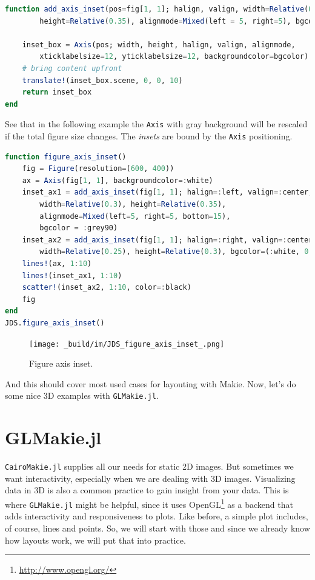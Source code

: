 \documentclass[
  notoc %
]{tufte-book}
\DeclareRobustCommand{\href}[2]{#2\footnote{\url{#1}}}
\newcommand{\passthrough}[1]{#1}
\begin{document}
\begin{lstlisting}[language=Julia]
function add_axis_inset(pos=fig[1, 1]; halign, valign, width=Relative(0.5),
        height=Relative(0.35), alignmode=Mixed(left = 5, right=5), bgcolor=:lightgray)

    inset_box = Axis(pos; width, height, halign, valign, alignmode,
        xticklabelsize=12, yticklabelsize=12, backgroundcolor=bgcolor)
    # bring content upfront
    translate!(inset_box.scene, 0, 0, 10)
    return inset_box
end
\end{lstlisting}

See that in the following example the \passthrough{\lstinline!Axis!}
with gray background will be rescaled if the total figure size changes.
The \emph{insets} are bound by the \passthrough{\lstinline!Axis!}
positioning.

\begin{lstlisting}[language=Julia]
function figure_axis_inset()
    fig = Figure(resolution=(600, 400))
    ax = Axis(fig[1, 1], backgroundcolor=:white)
    inset_ax1 = add_axis_inset(fig[1, 1]; halign=:left, valign=:center,
        width=Relative(0.3), height=Relative(0.35),
        alignmode=Mixed(left=5, right=5, bottom=15),
        bgcolor = :grey90)
    inset_ax2 = add_axis_inset(fig[1, 1]; halign=:right, valign=:center,
        width=Relative(0.25), height=Relative(0.3), bgcolor=(:white, 0.65))
    lines!(ax, 1:10)
    lines!(inset_ax1, 1:10)
    scatter!(inset_ax2, 1:10, color=:black)
    fig
end
JDS.figure_axis_inset()
\end{lstlisting}

\begin{figure}
\hypertarget{fig:figure_axis_inset}{%
\centering
\texttt{[image: \_build/im/JDS\_figure\_axis\_inset\_.png]}
\caption{Figure axis inset.}\label{fig:figure_axis_inset}
}
\end{figure}

And this should cover most used cases for layouting with Makie. Now,
let's do some nice 3D examples with
\passthrough{\lstinline!GLMakie.jl!}.

\hypertarget{sec:glmakie}{%
\section{GLMakie.jl}\label{sec:glmakie}}

\passthrough{\lstinline!CairoMakie.jl!} supplies all our needs for
static 2D images. But sometimes we want interactivity, especially when
we are dealing with 3D images. Visualizing data in 3D is also a common
practice to gain insight from your data. This is where
\passthrough{\lstinline!GLMakie.jl!} might be helpful, since it uses
\href{http://www.opengl.org/}{OpenGL} as a backend that adds
interactivity and responsiveness to plots. Like before, a simple plot
includes, of course, lines and points. So, we will start with those and
since we already know how layouts work, we will put that into practice.
\end{document}
